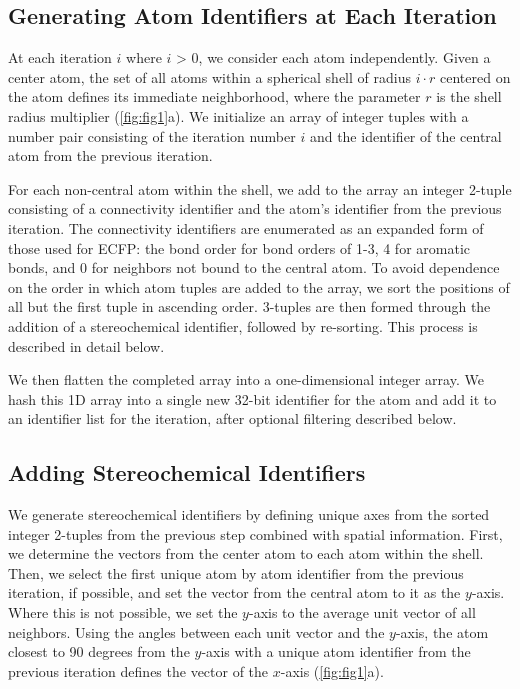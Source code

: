 \documentclass[../../main.tex]{subfiles}
\begin{document}
\begin{refsection}
	\subsection*{Generating Atom Identifiers at Each Iteration}

	At each iteration $i$ where $i$ \textgreater{} 0, we consider each atom independently.
	Given a center atom, the set of all atoms within a spherical shell of radius $i \cdot r$ centered on the atom defines its immediate neighborhood, where the parameter $r$ is the shell radius multiplier (\cref{fig:fig1}a).
	We initialize an array of integer tuples with a number pair consisting of the iteration number $i$ and the identifier of the central atom from the previous iteration.

	For each non-central atom within the shell, we add to the array an integer 2-tuple consisting of a connectivity identifier and the atom's identifier from the previous iteration.
	The connectivity identifiers are enumerated as an expanded form of those used for ECFP: the bond order for bond orders of 1-3, 4 for aromatic bonds, and 0 for neighbors not bound to the central atom.
	To avoid dependence on the order in which atom tuples are added to the array, we sort the positions of all but the first tuple in ascending order.
	3-tuples are then formed through the addition of a stereochemical identifier, followed by re-sorting.
	This process is described in detail below.

	We then flatten the completed array into a one-dimensional integer array.
	We hash this 1D array into a single new 32-bit identifier for the atom and add it to an identifier list for the iteration, after optional filtering described below.

	\subsection*{Adding Stereochemical Identifiers}

	We generate stereochemical identifiers by defining unique axes from the sorted integer 2-tuples from the previous step combined with spatial information.
	First, we determine the vectors from the center atom to each atom within the shell.
	Then, we select the first unique atom by atom identifier from the previous iteration, if possible, and set the vector from the central atom to it as the $y$-axis.
	Where this is not possible, we set the $y$-axis to the average unit vector of all neighbors.
	Using the angles between each unit vector and the  $y$-axis, the atom closest to 90 degrees from the $y$-axis with a unique atom identifier from the previous iteration defines the vector of the $x$-axis (\cref{fig:fig1}a).


\end{refsection}
\end{document}
